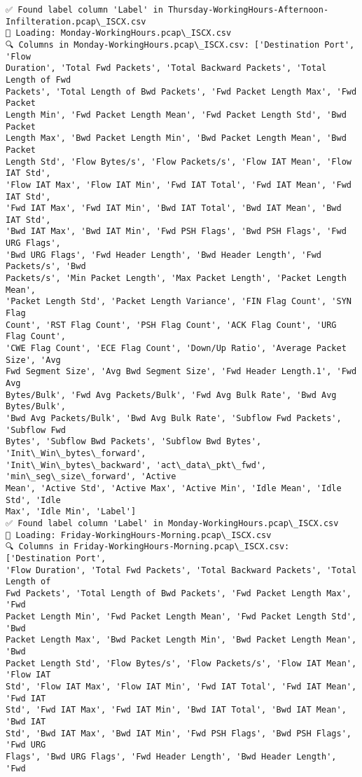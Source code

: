 \documentclass[11pt]{article}
\begin{document}
\begin{Verbatim}[commandchars=\\\{\}]
✅ Found label column 'Label' in Thursday-WorkingHours-Afternoon-
Infilteration.pcap\_ISCX.csv
📅 Loading: Monday-WorkingHours.pcap\_ISCX.csv
🔍 Columns in Monday-WorkingHours.pcap\_ISCX.csv: ['Destination Port', 'Flow
Duration', 'Total Fwd Packets', 'Total Backward Packets', 'Total Length of Fwd
Packets', 'Total Length of Bwd Packets', 'Fwd Packet Length Max', 'Fwd Packet
Length Min', 'Fwd Packet Length Mean', 'Fwd Packet Length Std', 'Bwd Packet
Length Max', 'Bwd Packet Length Min', 'Bwd Packet Length Mean', 'Bwd Packet
Length Std', 'Flow Bytes/s', 'Flow Packets/s', 'Flow IAT Mean', 'Flow IAT Std',
'Flow IAT Max', 'Flow IAT Min', 'Fwd IAT Total', 'Fwd IAT Mean', 'Fwd IAT Std',
'Fwd IAT Max', 'Fwd IAT Min', 'Bwd IAT Total', 'Bwd IAT Mean', 'Bwd IAT Std',
'Bwd IAT Max', 'Bwd IAT Min', 'Fwd PSH Flags', 'Bwd PSH Flags', 'Fwd URG Flags',
'Bwd URG Flags', 'Fwd Header Length', 'Bwd Header Length', 'Fwd Packets/s', 'Bwd
Packets/s', 'Min Packet Length', 'Max Packet Length', 'Packet Length Mean',
'Packet Length Std', 'Packet Length Variance', 'FIN Flag Count', 'SYN Flag
Count', 'RST Flag Count', 'PSH Flag Count', 'ACK Flag Count', 'URG Flag Count',
'CWE Flag Count', 'ECE Flag Count', 'Down/Up Ratio', 'Average Packet Size', 'Avg
Fwd Segment Size', 'Avg Bwd Segment Size', 'Fwd Header Length.1', 'Fwd Avg
Bytes/Bulk', 'Fwd Avg Packets/Bulk', 'Fwd Avg Bulk Rate', 'Bwd Avg Bytes/Bulk',
'Bwd Avg Packets/Bulk', 'Bwd Avg Bulk Rate', 'Subflow Fwd Packets', 'Subflow Fwd
Bytes', 'Subflow Bwd Packets', 'Subflow Bwd Bytes', 'Init\_Win\_bytes\_forward',
'Init\_Win\_bytes\_backward', 'act\_data\_pkt\_fwd', 'min\_seg\_size\_forward', 'Active
Mean', 'Active Std', 'Active Max', 'Active Min', 'Idle Mean', 'Idle Std', 'Idle
Max', 'Idle Min', 'Label']
✅ Found label column 'Label' in Monday-WorkingHours.pcap\_ISCX.csv
📅 Loading: Friday-WorkingHours-Morning.pcap\_ISCX.csv
🔍 Columns in Friday-WorkingHours-Morning.pcap\_ISCX.csv: ['Destination Port',
'Flow Duration', 'Total Fwd Packets', 'Total Backward Packets', 'Total Length of
Fwd Packets', 'Total Length of Bwd Packets', 'Fwd Packet Length Max', 'Fwd
Packet Length Min', 'Fwd Packet Length Mean', 'Fwd Packet Length Std', 'Bwd
Packet Length Max', 'Bwd Packet Length Min', 'Bwd Packet Length Mean', 'Bwd
Packet Length Std', 'Flow Bytes/s', 'Flow Packets/s', 'Flow IAT Mean', 'Flow IAT
Std', 'Flow IAT Max', 'Flow IAT Min', 'Fwd IAT Total', 'Fwd IAT Mean', 'Fwd IAT
Std', 'Fwd IAT Max', 'Fwd IAT Min', 'Bwd IAT Total', 'Bwd IAT Mean', 'Bwd IAT
Std', 'Bwd IAT Max', 'Bwd IAT Min', 'Fwd PSH Flags', 'Bwd PSH Flags', 'Fwd URG
Flags', 'Bwd URG Flags', 'Fwd Header Length', 'Bwd Header Length', 'Fwd

\end{Verbatim}
\end{document}
